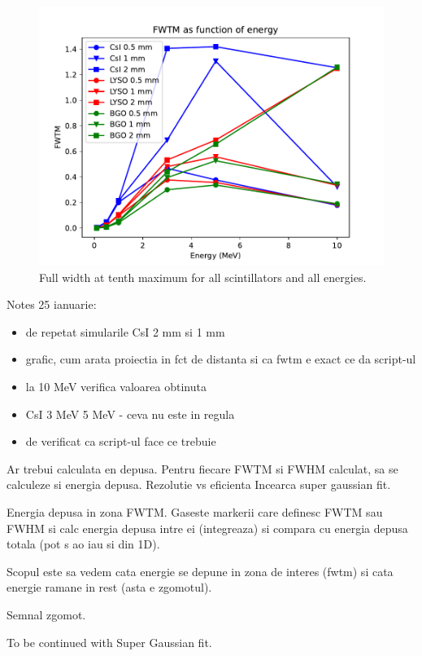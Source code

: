\documentclass{article}
\begin{document}
\begin{figure}[H]
    \centering
    \includegraphics[width=\linewidth]{images/task4/FWTM_all.pdf}
    \caption{Full width at tenth maximum for all scintillators and all energies.}
\end{figure}

Notes 25 ianuarie:

\begin{itemize}
  \item de repetat simularile CsI 2 mm si 1 mm
  \item grafic, cum arata proiectia in fct de distanta si ca fwtm e exact ce da script-ul
  \item la 10 MeV verifica valoarea obtinuta
  \item CsI 3 MeV 5 MeV - ceva nu este in regula
  \item de verificat ca script-ul face ce trebuie
\end{itemize}



Ar trebui calculata en depusa. Pentru fiecare FWTM si FWHM calculat, sa se calculeze si energia depusa. Rezolutie vs eficienta
Incearca super gaussian fit.

Energia depusa in zona FWTM. Gaseste markerii care definesc FWTM sau FWHM si calc energia depusa intre ei (integreaza) si compara cu energia depusa totala (pot s ao iau si din 1D).

Scopul este sa vedem cata energie se depune in zona de interes (fwtm) si cata energie ramane in rest (asta e zgomotul).

Semnal zgomot.

To be continued with Super Gaussian fit.
\end{document}

